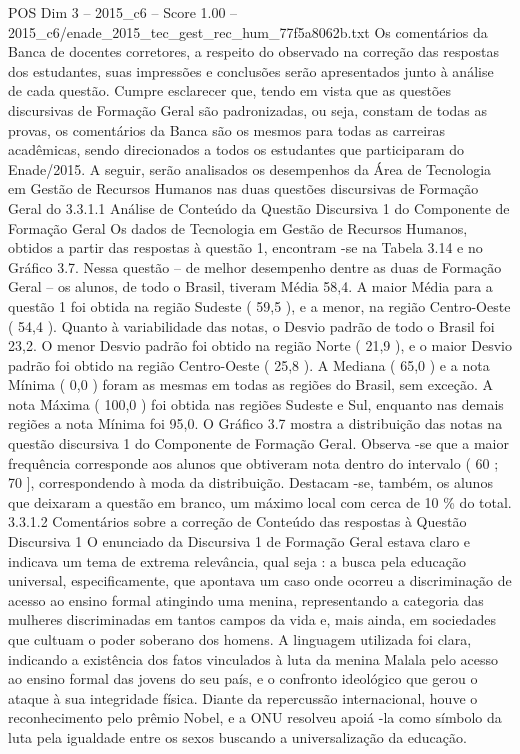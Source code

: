 \begin{textsample}{POS Dim 3 – 2015\_c6 – Score 1.00 – 2015\_c6/enade\_2015\_tec\_gest\_rec\_hum\_77f5a8062b.txt}
Os comentários da Banca de docentes corretores, a respeito do observado na correção das respostas dos estudantes, suas impressões e conclusões serão apresentados junto à análise de cada questão.
Cumpre esclarecer que, tendo em vista que as questões discursivas de Formação Geral são padronizadas, ou seja, constam de todas as provas, os comentários da Banca são os mesmos para todas as carreiras acadêmicas, sendo direcionados a todos os estudantes que participaram do Enade/2015.
A seguir, serão analisados os desempenhos da Área de Tecnologia em Gestão de Recursos Humanos nas duas questões discursivas de Formação Geral do 3.3.1.1 Análise de Conteúdo da Questão Discursiva 1 do Componente de Formação Geral Os dados de Tecnologia em Gestão de Recursos Humanos, obtidos a partir das respostas à questão 1, encontram -se na Tabela 3.14 e no Gráfico 3.7.
Nessa questão – de melhor desempenho dentre as duas de Formação Geral – os alunos, de todo o Brasil, tiveram Média 58,4.
A maior Média para a questão 1 foi obtida na região Sudeste ( 59,5 ), e a menor, na região Centro-Oeste ( 54,4 ).
Quanto à variabilidade das notas, o Desvio padrão de todo o Brasil foi 23,2.
O menor Desvio padrão foi obtido na região Norte ( 21,9 ), e o maior Desvio padrão foi obtido na região Centro-Oeste ( 25,8 ).
A Mediana ( 65,0 ) e a nota Mínima ( 0,0 ) foram as mesmas em todas as regiões do Brasil, sem exceção.
A nota Máxima ( 100,0 ) foi obtida nas regiões Sudeste e Sul, enquanto nas demais regiões a nota Mínima foi 95,0.
O Gráfico 3.7 mostra a distribuição das notas na questão discursiva 1 do Componente de Formação Geral.
Observa -se que a maior frequência corresponde aos alunos que obtiveram nota dentro do intervalo ( 60 ; 70 ], correspondendo à moda da distribuição.
Destacam -se, também, os alunos que deixaram a questão em branco, um máximo local com cerca de 10 \% do total. 3.3.1.2 Comentários sobre a correção de Conteúdo das respostas à Questão Discursiva 1 O enunciado da Discursiva 1 de Formação Geral estava claro e indicava um tema de extrema relevância, qual seja : a busca pela educação universal, especificamente, que apontava um caso onde ocorreu a discriminação de acesso ao ensino formal atingindo uma menina, representando a categoria das mulheres discriminadas em tantos campos da vida e, mais ainda, em sociedades que cultuam o poder soberano dos homens.
A linguagem utilizada foi clara, indicando a existência dos fatos vinculados à luta da menina Malala pelo acesso ao ensino formal das jovens do seu país, e o confronto ideológico que gerou o ataque à sua integridade física.
Diante da repercussão internacional, houve o reconhecimento pelo prêmio Nobel, e a ONU resolveu apoiá -la como símbolo da luta pela igualdade entre os sexos buscando a universalização da educação.

\end{textsample}
